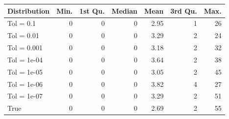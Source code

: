 \begin{figure} 
\begin{tabular}{lrrrrrr}
 Distribution & Min. & 1st Qu. & Median & Mean & 3rd Qu. & Max. \\ 
  \hline
\hline
Tol =  0.1 & 0 & 0 & 0 & 2.95 & 1 & 26 \\ 
  Tol =  0.01 & 0 & 0 & 0 & 3.29 & 2 & 24 \\ 
  Tol =  0.001 & 0 & 0 & 0 & 3.18 & 2 & 32 \\ 
  Tol =  1e-04 & 0 & 0 & 0 & 3.64 & 2 & 38 \\ 
  Tol =  1e-05 & 0 & 0 & 0 & 3.05 & 2 & 45 \\ 
  Tol =  1e-06 & 0 & 0 & 0 & 3.82 & 4 & 27 \\ 
  Tol =  1e-07 & 0 & 0 & 0 & 3.29 & 2 & 51 \\ 
  True & 0 & 0 & 0 & 2.69 & 2 & 55 \\ 
  \end{tabular}
\label{tab:SummaryTable}
\end{figure} 

